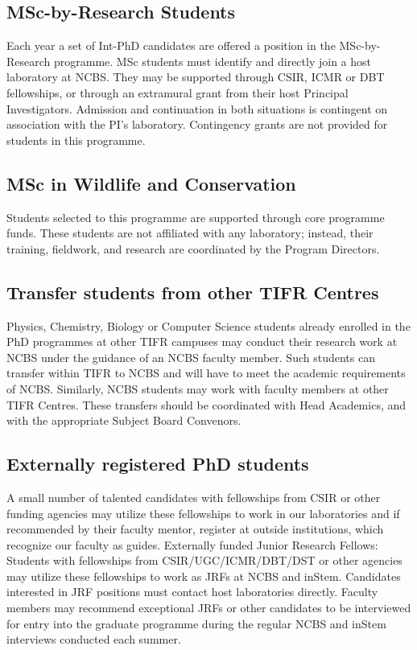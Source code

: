 \documentclass[a4paper]{extarticle}
\begin{document}
\subsection{MSc-by-Research Students}
Each year a set of Int-PhD candidates are
offered a position in the MSc-by-Research programme. MSc students must identify
and directly join a host laboratory at NCBS. They may be supported through CSIR,
ICMR or DBT fellowships, or through an extramural grant from their host
Principal Investigators. Admission and continuation in both situations is
contingent on association with the PI’s laboratory.  Contingency grants are not
provided for students in this programme.

\subsection{MSc in Wildlife and Conservation}
Students selected to this programme are supported through core programme funds.
These students are not affiliated with any laboratory; instead, their training,
fieldwork, and research are coordinated by the Program Directors. 

\subsection{Transfer students from other TIFR Centres}
Physics, Chemistry, Biology or Computer
Science students already enrolled in the PhD programmes at other TIFR campuses
may conduct their research work at NCBS under the guidance of an NCBS faculty
member. Such students can transfer within TIFR to NCBS and will have to meet the
academic requirements of NCBS. Similarly, NCBS students may work with faculty
members at other TIFR Centres.  These transfers should be coordinated with Head
Academics, and with the appropriate Subject Board Convenors. 

\subsection{Externally registered PhD students}
A small number of talented candidates with fellowships
from CSIR or other funding agencies may utilize these fellowships to work in our
laboratories and if recommended by their faculty mentor, register at outside
institutions, which recognize our faculty as guides.  Externally funded Junior
Research Fellows: Students with fellowships from CSIR/UGC/ICMR/DBT/DST or other
agencies may utilize these fellowships to work as JRFs at NCBS and inStem.
Candidates interested in JRF positions must contact host laboratories directly.
Faculty members may recommend exceptional JRFs or other candidates to be
interviewed for entry into the graduate programme during the regular NCBS and
inStem interviews conducted each summer. 
\end{document}
